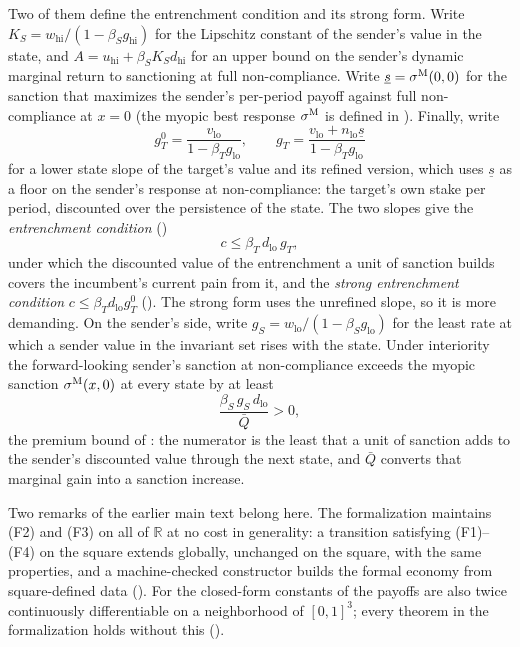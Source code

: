 Two of them define the entrenchment condition and its strong form. Write
$K_S=w_{\mathrm{hi}}/(1-\beta_S g_{\mathrm{hi}})$ for the Lipschitz constant of
the sender's value in the state, and
$A=u_{\mathrm{hi}}+\beta_S K_S d_{\mathrm{hi}}$ for an upper bound on the
sender's dynamic marginal return to sanctioning at full non-compliance. Write
$\underline s=\sigma^{\mathrm{M}}(0,0)$ for the sanction that maximizes the sender's
per-period payoff against full non-compliance at $x=0$ (the myopic best response
$\sigma^{\mathrm{M}}$ is defined in ). Finally, write
\begin{equation}
g_T^0=\frac{v_{\mathrm{lo}}}{1-\beta_T g_{\mathrm{lo}}},
\qquad
g_T=\frac{v_{\mathrm{lo}}+n_{\mathrm{lo}}\underline s}{1-\beta_T g_{\mathrm{lo}}}
\label{eq:target-slopes}
\end{equation}
for a lower state slope of the target's value and its refined version, which
uses $\underline s$ as a floor on the sender's response at non-compliance: the target's
own stake per period, discounted over the persistence of the state. The two
slopes give the \emph{entrenchment condition} ()
\begin{equation}
c\le\beta_T\,d_{\mathrm{lo}}\,g_T ,
\label{eq:loss-offset}
\end{equation}
under which the discounted value of the entrenchment a unit of sanction builds
covers the incumbent's current pain from it, and the \emph{strong entrenchment
condition} $c\le\beta_Td_{\mathrm{lo}}g_T^0$ (). The
strong form uses the unrefined slope, so it is more demanding. On the sender's
side, write $g_S=w_{\mathrm{lo}}/(1-\beta_S g_{\mathrm{lo}})$ for the least rate at
which a sender value in the invariant set rises with the state. Under interiority
the forward-looking sender's sanction at non-compliance exceeds the myopic sanction
$\sigma^{\mathrm{M}}(x,0)$ at every state by at least
\begin{equation}
\frac{\beta_S\,g_S\,d_{\mathrm{lo}}}{\bar Q}>0 ,
\label{eq:sender-wedge}
\end{equation}
the premium bound of : the numerator is the least that a unit
of sanction adds to the sender's discounted value through the next state, and
$\bar Q$ converts that marginal gain into a sanction increase.

Two remarks of the earlier main text belong here. The formalization maintains
\textup{(F2)} and \textup{(F3)} on all of $\mathbb{R}$ at no cost in generality: a
transition satisfying \textup{(F1)--(F4)} on the square extends globally, unchanged
on the square, with the same properties, and a machine-checked constructor builds
the formal economy from square-defined data (). For the
closed-form constants of  the payoffs are also twice
continuously differentiable on a neighborhood of $[0,1]^3$; every theorem in the
formalization holds without this ().

